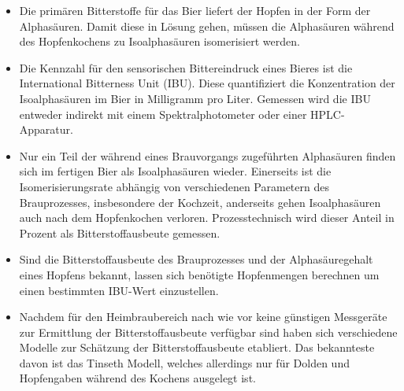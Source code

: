 \documentclass[a4paper,parskip=half]{scrartcl}
\begin{document}
\begin{itemize}
\item Die primären Bitterstoffe für das Bier liefert der Hopfen in der Form der Alphasäuren. Damit diese in Lösung gehen, müssen die Alphasäuren während des Hopfenkochens zu Isoalphasäuren isomerisiert werden.
   
\item Die Kennzahl für den sensorischen Bittereindruck eines Bieres ist die International Bitterness Unit (IBU). Diese quantifiziert die Konzentration der Isoalphasäuren im Bier in Milligramm pro Liter. Gemessen wird die IBU entweder indirekt mit einem Spektralphotometer oder einer HPLC-Apparatur.

\item Nur ein Teil der während eines Brauvorgangs zugeführten Alphasäuren finden sich im fertigen Bier als Isoalphasäuren wieder. Einerseits ist die Isomerisierungsrate abhängig von verschiedenen Parametern des Brauprozesses, insbesondere der Kochzeit, anderseits gehen Isoalphasäuren auch nach dem Hopfenkochen verloren. Prozesstechnisch wird dieser Anteil in Prozent als Bitterstoffausbeute gemessen.

\item Sind die Bitterstoffausbeute des Brauprozesses und der Alphasäuregehalt eines Hopfens bekannt, lassen sich benötigte Hopfenmengen berechnen um einen bestimmten IBU-Wert einzustellen.

\item Nachdem für den Heimbraubereich nach wie vor keine günstigen Messgeräte zur Ermittlung der Bitterstoffausbeute verfügbar sind haben sich verschiedene Modelle zur Schätzung der Bitterstoffausbeute etabliert. Das bekannteste davon ist das Tinseth Modell, welches allerdings nur für Dolden und Hopfengaben während des Kochens ausgelegt ist.

\end{itemize}

\printbibliography[title=Quellen]
\end{document}
